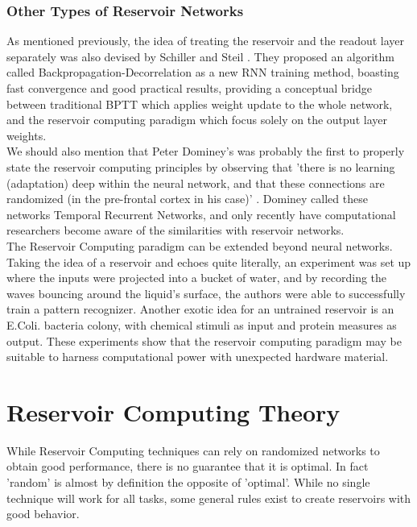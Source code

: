 \documentclass[12pt,oneside]{CUNY_CS_PhD}
\begin{document}
\subsubsection{Other Types of Reservoir Networks}
As mentioned previously, the idea of treating the reservoir and the readout layer separately was also devised by Schiller and Steil \cite{steil2004backpropagation}. They proposed an algorithm called Backpropagation-Decorrelation as a new RNN training method, boasting fast convergence and good practical results, providing a conceptual bridge between traditional BPTT which applies weight update to the whole network, and the reservoir computing paradigm which focus solely on the output layer weights.\\ 
We should also mention that Peter Dominey's was probably the first to properly state the reservoir computing principles by observing that 'there is no learning (adaptation) deep within the neural network, and that these connections are randomized (in the pre-frontal cortex in his case)' \cite{DomineyRamus00}. Dominey called these networks Temporal Recurrent Networks, and only recently have computational researchers become aware of the similarities with reservoir networks.\\
The Reservoir Computing paradigm can be extended beyond neural networks. Taking the idea of a reservoir and echoes quite literally, an experiment was set up where the inputs were projected into a bucket of water, and by recording the waves bouncing around the liquid's surface, the authors were able to successfully train a pattern recognizer. Another exotic idea for an untrained reservoir is an E.Coli. bacteria colony, with chemical stimuli as input and protein measures as output. These experiments show that the reservoir computing paradigm may be suitable to harness computational power with unexpected hardware material.

\section{Reservoir Computing Theory}
\label{theory} 
While Reservoir Computing techniques can rely on randomized networks to obtain good performance, there is no guarantee that it is optimal. In fact 'random' is almost by definition the opposite of 'optimal'. While no single technique will work for all tasks, some general rules exist to create reservoirs with good behavior.
\end{document}
